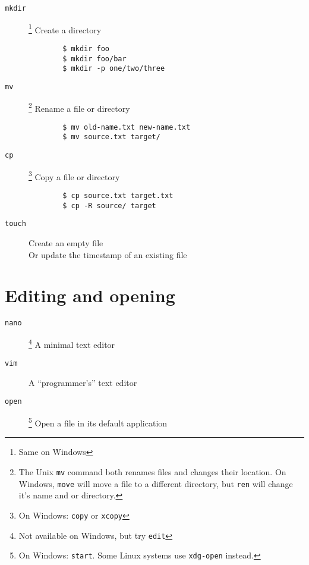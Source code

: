 \documentclass[a4paper]{tufte-handout}
\begin{document}
\begin{description}
    \item [\texttt{mkdir}]
        \footnote{Same on Windows}
        \hfill Create a directory
        \begin{verbatim}
        $ mkdir foo
        $ mkdir foo/bar
        $ mkdir -p one/two/three
        \end{verbatim}
    \item [\texttt{mv}]\footnote{
        The Unix \texttt{mv} command both renames files and changes their
        location. On Windows, \texttt{move} will move a file to a different
        directory, but \texttt{ren} will change it's name and or directory.}
        \hfill Rename a file or directory
        \begin{verbatim}
        $ mv old-name.txt new-name.txt
        $ mv source.txt target/
        \end{verbatim}
    \item [\texttt{cp}]
        \footnote{On Windows: \texttt{copy} or \texttt{xcopy}}
        \hfill Copy a file or directory
        \begin{verbatim}
        $ cp source.txt target.txt
        $ cp -R source/ target
        \end{verbatim}
    \item [\texttt{touch}]
        \hfill Create an empty file \\
        \hfill Or update the timestamp of an existing file
\end{description}

\hrulefill{}

\section{Editing and opening}

\begin{description}
    \item [\texttt{nano}]
        \footnote{Not available on Windows, but try \texttt{edit}}
        \hfill A minimal text editor
    \item [\texttt{vim}]
        \hfill A \enquote{programmer's} text editor
    \item [\texttt{open}]
        \footnote{On Windows: \texttt{start}.
        Some Linux systems use \texttt{xdg-open} instead.}
        \hfill Open a file in its default application
\end{description}

\hrulefill{}
\end{document}
